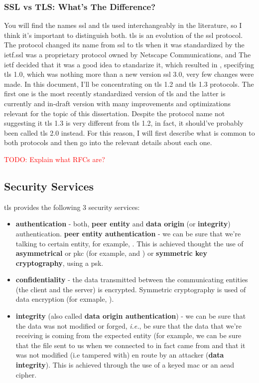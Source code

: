 \documentclass{llncs}
\newcommand{\todo}[1]{\textcolor{red}{TODO: #1}\PackageWarning{TODO:}{#1!}}
\begin{document}
\subsubsection{SSL vs TLS: What's The Difference?}
You will find the names \gls{ssl} and \gls{tls} used interchangeably in the literature,
so I think it's important to distinguish both. \gls{tls} is an evolution of the \gls{ssl} protocol. The protocol changed
its name from \gls{ssl} to \gls{tls} when it was
standardized by the \gls{ietf}.\gls{ssl}
was a proprietary protocol owned by Netscape Communications, and The \gls{ietf}
decided that it was a good idea to standarize it, which resulted in  \cite{RFC2246},
specifying \gls{tls} 1.0, which was nothing more than a new version \gls{ssl} 3.0,
very few changes were made.
%
In this document, I'll be concentrating on \gls{tls} 1.2 and \gls{tls} 1.3 protocols.
The first one is the most recently standardized version of \gls{tls} and the latter
is currently and in-draft version with many improvements and optimizations relevant
for the topic of this dissertation. Despite the protocol name not suggesting it \gls{tls} 1.3 is
very different from \gls{tls} 1.2, in fact, it should've probably been called
\gls{tls} 2.0 instead. For this reason, I will first describe what is common to
both protocols and then go into the relevant details about each one.
%

\todo{Explain what RFCs are?}
%
\subsection{Security Services}
%
\gls{tls} provides the following 3 security services:
\begin{itemize}
\item \textbf{authentication} - both, \textbf{peer entity} and \textbf{data origin} (or \textbf{integrity})
authentication.
\subitem \textbf{peer entity authentication} - we can be sure that we’re talking to certain entity, for example, .
This is achieved thought the use of \textbf{asymmetrical} or \gls{pkc} (for example,  and )
or \textbf{symmetric key cryptography}, using a \gls{psk}.
\item \textbf{confidentiality} - the data transmitted between the communicating
entities (the client and the server) is encrypted. Symmetric cryptography is
used of data encryption (for exmaple, ).
\item \textbf{integrity} (also called \textbf{data origin authentication}) - we can be sure that the data was not modified or forged,
\textit{i.e.}, be sure that the data that we’re receiving is coming from the expected entity (for example, we can be sure
that the  file sent to us when we connected to  in fact
came from  and that it was not modified (i.e tampered with) en
route by an attacker (\textbf{data integrity}). This is achieved through the use
of a keyed \gls{mac} or an \gls{aead} cipher.
\end{itemize}
\end{document}
